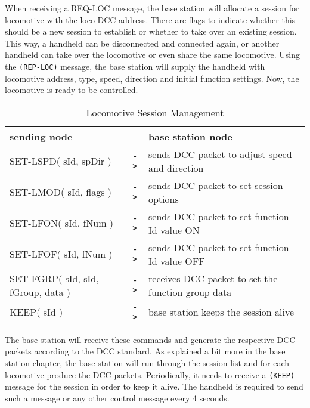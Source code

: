 When receiving a REQ-LOC message, the base station will allocate a session for locomotive with the loco DCC address. There are flags to indicate whether this should be a new session to establish or whether to take over an existing session. This way, a handheld can be disconnected and connected again, or another handheld can take over the locomotive or even share the same locomotive. Using the \texttt{(REP-LOC)} message, the base station will supply the handheld with locomotive address, type, speed, direction and initial function settings. Now, the locomotive is ready to be controlled.

\begin{table}[ht!]
    \begin{center}
        \caption{Locomotive Session Management}
        \begin{tabular}{|p{}| c |p{}|}
            \toprule
            \textbf{sending node} & & \textbf{ base station node } \\
            \midrule
            SET-LSPD( sId, spDir ) & \texttt{->} & sends DCC packet to adjust speed and direction  \\
            SET-LMOD( sId, flags ) & \texttt{->} & sends DCC packet to set session options   \\
            SET-LFON( sId, fNum ) & \texttt{->} & sends DCC packet to set function Id value ON  \\
            SET-LFOF( sId, fNum ) & \texttt{->} & sends DCC packet to set function Id value OFF  \\
            SET-FGRP( sId, sId, fGroup, data ) & \texttt{->} & receives DCC packet to set the function group data  \\
            KEEP( sId ) & \texttt{->} & base station keeps the session alive  \\
            \bottomrule
        \end{tabular}
    \end{center}
\end{table}

The base station will receive these commands and generate the respective DCC packets according to the DCC standard. As explained a bit more in the base station chapter, the base station will run through the session list and for each locomotive produce the DCC packets. Periodically, it needs to receive a \texttt{(KEEP)} message for the session in order to keep it alive. The handheld is required to send such a message or any other control message every 4 seconds.

